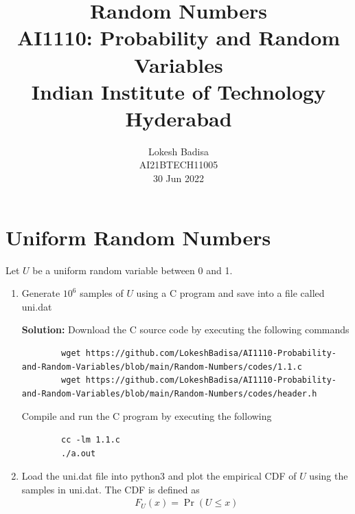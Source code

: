 \documentclass[journal,12pt,twocolumn]{IEEEtran}
\title{Random Numbers \\ \Large AI1110: Probability and Random Variables \\ \large Indian Institute of Technology Hyderabad}
\author{Lokesh Badisa \\ \normalsize AI21BTECH11005 \\ \vspace*{20pt} \normalsize  30 Jun 2022}
\newcommand{\solution}{\noindent \textbf{Solution: }}
\providecommand{\pr}[1]{\ensuremath{\Pr\left(#1\right)}}
\numberwithin{equation}{section}
\renewcommand\thesection{\arabic{section}}
\begin{document}
	\maketitle
	
	\section{Uniform Random Numbers}
	Let $U$ be a uniform random variable between 0 and 1.
	\begin{enumerate}[label=\thesection.\arabic*,ref=\thesection.\theenumi]
	\item Generate $10^6$ samples of $U$ using a C program and save into a file called uni.dat

	\solution Download the C source code by executing the following commands
	\begin{lstlisting}
		wget https://github.com/LokeshBadisa/AI1110-Probability-and-Random-Variables/blob/main/Random-Numbers/codes/1.1.c
		wget https://github.com/LokeshBadisa/AI1110-Probability-and-Random-Variables/blob/main/Random-Numbers/codes/header.h
	\end{lstlisting}
	Compile and run the C program by executing the following
	\begin{lstlisting}
		cc -lm 1.1.c
		./a.out
	\end{lstlisting}
	
	\item Load the uni.dat file into python3 and plot the empirical CDF of $U$ using the samples in uni.dat. The CDF is defined as
	\begin{align}
		F_{U}(x) = \pr{U \le x}
	\end{align}


\end{enumerate}
\end{document}
